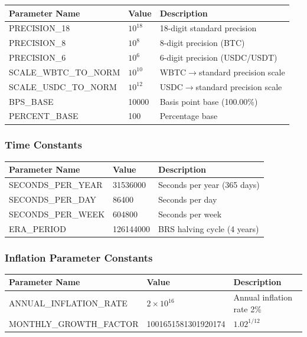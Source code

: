 \documentclass{article}
\begin{document}
{\small
\begin{center}
\begin{longtable}{p{5.5cm}p{3cm}p{5.5cm}}
\toprule
Parameter Name & Value & Description \\
\midrule
\endhead
PRECISION\_18 & $10^{18}$ & 18-digit standard precision \\
PRECISION\_8 & $10^{8}$ & 8-digit precision (BTC) \\
PRECISION\_6 & $10^{6}$ & 6-digit precision (USDC/USDT) \\
SCALE\_WBTC\_TO\_NORM & $10^{10}$ & WBTC$\rightarrow$standard precision scale \\
SCALE\_USDC\_TO\_NORM & $10^{12}$ & USDC$\rightarrow$standard precision scale \\
BPS\_BASE & 10000 & Basis point base (100.00\%) \\
PERCENT\_BASE & 100 & Percentage base \\
\bottomrule
\end{longtable}
\end{center}
}

\subsubsection{Time Constants}

\begin{center}
\begin{longtable}{p{5cm}p{4cm}p{5cm}}
\toprule
Parameter Name & Value & Description \\
\midrule
\endhead
SECONDS\_PER\_YEAR & 31536000 & Seconds per year (365 days) \\
SECONDS\_PER\_DAY & 86400 & Seconds per day \\
SECONDS\_PER\_WEEK & 604800 & Seconds per week \\
ERA\_PERIOD & 126144000 & BRS halving cycle (4 years) \\
\bottomrule
\end{longtable}
\end{center}

\subsubsection{Inflation Parameter Constants}

{\small
\begin{center}
\begin{longtable}{p{6cm}p{5cm}p{3cm}}
\toprule
Parameter Name & Value & Description \\
\midrule
\endhead
ANNUAL\_INFLATION\_RATE & $2 \times 10^{16}$ & Annual inflation rate 2\% \\
MONTHLY\_GROWTH\_FACTOR & 1001651581301920174 & $1.02^{1/12}$ \\
\bottomrule
\end{longtable}
\end{center}
}
\end{document}
